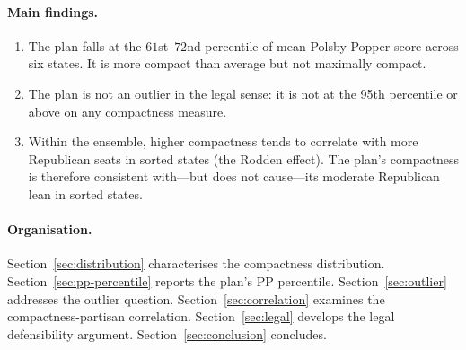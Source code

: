 \paragraph{Main findings.}
\begin{enumerate}
  \item The \ar{} plan falls at the $61$st--$72$nd percentile of mean
    Polsby-Popper score across six states.  It is more compact than average
    but not maximally compact.
  \item The \ar{} plan is not an outlier in the legal sense: it is not at
    the 95th percentile or above on any compactness measure.
  \item Within the \recom{} ensemble, higher compactness tends to correlate
    with more Republican seats in sorted states (the Rodden effect).  The
    \ar{} plan's compactness is therefore consistent with---but does not
    cause---its moderate Republican lean in sorted states.
\end{enumerate}

\paragraph{Organisation.}
Section~\ref{sec:distribution} characterises the \recom{} compactness
distribution.  Section~\ref{sec:pp-percentile} reports the \ar{} plan's
PP percentile.  Section~\ref{sec:outlier} addresses the outlier question.
Section~\ref{sec:correlation} examines the compactness-partisan correlation.
Section~\ref{sec:legal} develops the legal defensibility argument.
Section~\ref{sec:conclusion} concludes.
